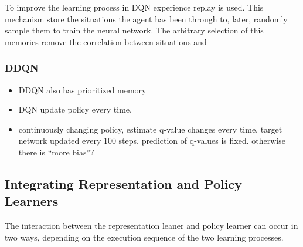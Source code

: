 To improve the learning process in DQN experience replay is used. This mechanism store the situations the agent has been through to, later, randomly sample them to train the neural network. The arbitrary selection of this memories remove the correlation between situations and 


\subsubsection{DDQN}
\begin{itemize}
	\item DDQN \citep{DDQN} also has prioritized memory 
	\item DQN update policy every time. 
	\item continuously changing policy, estimate q-value changes every time.
	target network updated every 100 steps. prediction of q-values is fixed. otherwise there is ``more bias''?
\end{itemize}

\subsection{Integrating Representation and Policy Learners}
The interaction between the representation leaner and policy learner can occur in two ways, depending on the execution sequence of the two learning processes.

